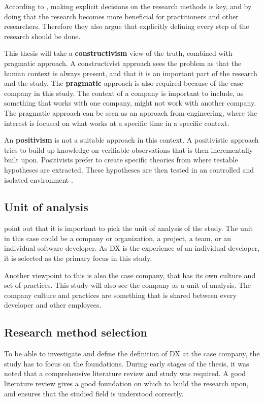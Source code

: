 \documentclass[english, 12pt, a4paper, sci, utf8, a-1b, online]{aaltothesis}
\begin{document}
According to \textcite{easterbrook2008selecting}, making explicit decisions on the research methods is key, and by doing that the research becomes more beneficial for practitioners and other researchers. Therefore they also argue that explicitly defining every step of the research should be done.

This thesis will take a \textbf{constructivism} view of the truth, combined with pragmatic approach. A constructivist approach sees the problem as that the human context is always present, and that it is an important part of the research and the study. The \textbf{pragmatic} approach is also required because of the case company in this study. The context of a company is important to include, as something that works with one company, might not work with another company. The pragmatic approach can be seen as an approach from engineering, where the interest is focused on what works at a specific time in a specific context.

An \textbf{positivism} is not a suitable approach in this context. A positivistic approach tries to build up knowledge on verifiable observations that is then incrementally built upon. Positivists prefer to create specific theories from where testable hypotheses are extracted. These hypotheses are then tested in an controlled and isolated environment \parencite{easterbrook2008selecting}.

\subsection{Unit of analysis}

\textcite{easterbrook2008selecting} point out that it is important to pick the unit of analysis of the study. The unit in this case could be a company or organization, a project, a team, or an individual software developer. As DX is the experience of an individual developer, it is selected as the primary focus in this study.

Another viewpoint to this is also the case company, that has its own culture and set of practices. This study will also see the company as a unit of analysis. The company culture and practices are something that is shared between every developer and other employees.

\subsection{Research method selection}

To be able to investigate and define the definition of DX at the case company, the study has to focus on the foundations. During early stages of the thesis, it was noted that a comprehensive literature review and study was required. A good literature review gives a good foundation on which to build the research upon, and ensures that the studied field is understood correctly.
\end{document}
